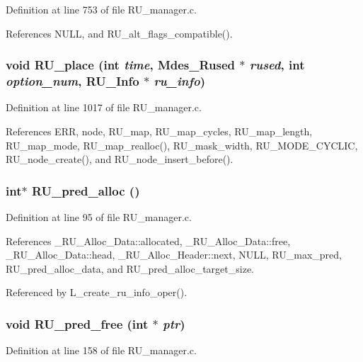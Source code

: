 Definition at line 753 of file RU\_\-manager.c.

References NULL, and RU\_\-alt\_\-flags\_\-compatible().
\subsubsection{\setlength{\rightskip}{0pt plus 5cm}void RU\_\-place (int {\em time}, Mdes\_\-Rused $\ast$ {\em rused}, int {\em option\_\-num}, \bf{RU\_\-Info} $\ast$ {\em ru\_\-info})}\label{RU__manager_8c_6da67e7a294620fb20f83f07d1ba8391}




Definition at line 1017 of file RU\_\-manager.c.

References ERR, node, RU\_\-map, RU\_\-map\_\-cycles, RU\_\-map\_\-length, RU\_\-map\_\-mode, RU\_\-map\_\-realloc(), RU\_\-mask\_\-width, RU\_\-MODE\_\-CYCLIC, RU\_\-node\_\-create(), and RU\_\-node\_\-insert\_\-before().
\subsubsection{\setlength{\rightskip}{0pt plus 5cm}int$\ast$ RU\_\-pred\_\-alloc ()}\label{RU__manager_8c_34fc03b647d985f62071736581eeada0}




Definition at line 95 of file RU\_\-manager.c.

References \_\-RU\_\-Alloc\_\-Data::allocated, \_\-RU\_\-Alloc\_\-Data::free, \_\-RU\_\-Alloc\_\-Data::head, \_\-RU\_\-Alloc\_\-Header::next, NULL, RU\_\-max\_\-pred, RU\_\-pred\_\-alloc\_\-data, and RU\_\-pred\_\-alloc\_\-target\_\-size.

Referenced by L\_\-create\_\-ru\_\-info\_\-oper().
\subsubsection{\setlength{\rightskip}{0pt plus 5cm}void RU\_\-pred\_\-free (int $\ast$ {\em ptr})}\label{RU__manager_8c_7fe7b921ed438a87c1cad6bafa91b8c9}




Definition at line 158 of file RU\_\-manager.c.

